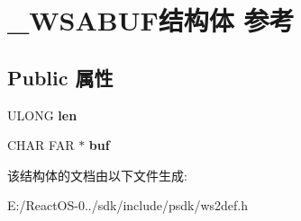 \hypertarget{struct___w_s_a_b_u_f}{}\section{\+\_\+\+W\+S\+A\+B\+U\+F结构体 参考}
\label{struct___w_s_a_b_u_f}
\subsection*{Public 属性}
\begin{DoxyCompactItemize}
\item 
\mbox{\label{struct___w_s_a_b_u_f_a9b7a712e34972f0fab29243f1793d38c}} 
U\+L\+O\+NG {\bfseries len}
\item 
\mbox{\label{struct___w_s_a_b_u_f_af63607a2757787b42c86cfdcae7e28d9}} 
C\+H\+AR F\+AR $\ast$ {\bfseries buf}
\end{DoxyCompactItemize}


该结构体的文档由以下文件生成\+:\begin{DoxyCompactItemize}
\item 
E\+:/\+React\+O\+S-\/0../sdk/include/psdk/ws2def.\+h\end{DoxyCompactItemize}
